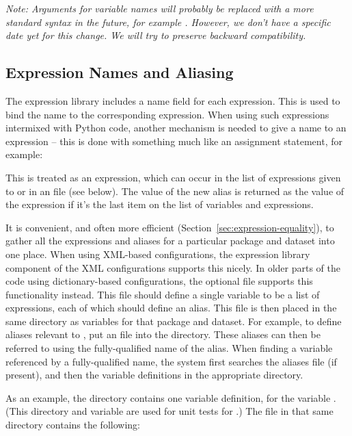 \emph{Note: Arguments for variable names will probably be replaced with a
  more standard syntax in the future, for example
  .  However, we don't have
  a specific date yet for this change.  We will try to preserve backward
  compatibility.}

\subsection{Expression Names and Aliasing}
\label{sec:urbansim-tutorial-aliasing}

The expression library includes a name field for each expression.  This is
used to bind the name to the corresponding expression.  When using such
expressions intermixed with Python code, another mechanism is needed to
give a name to an expression -- this is done with something much like an
assignment statement, for example:


This is treated as an expression, which can occur in the list of
expressions given to  or in an 
file (see below).  The value of the new alias is returned as the value of
the expression if it's the last item on the list of variables and
expressions.

It is convenient, and often more efficient
(Section~\ref{sec:expression-equality}), to gather all the expressions and
aliases for a particular package and dataset into one place.  When using 
XML-based configurations, the expression library component of the XML configurations
supports this nicely.  In older parts of the code using dictionary-based
configurations, the optional
 file supports this functionality instead.
This file should define a single variable  to be a list of expressions,
each of which should define an alias.  This file is then placed in the same
directory as variables for that package and dataset.  For example, to
define aliases relevant to , put an
 file into the  directory.  These
aliases can then be referred to using the fully-qualified name of the
alias.  When finding a variable referenced by a fully-qualified name, the
system first searches the aliases file (if present), and then the variable
definitions in the appropriate directory.

As an example, the directory  contains one
variable definition, for the variable .  (This
directory and variable are used for unit tests for .)
The file  in that same directory contains the following:

